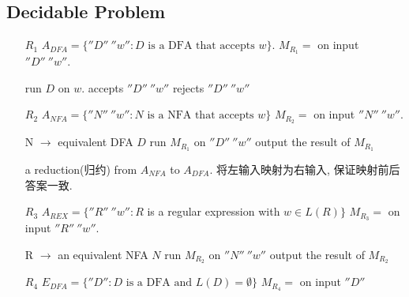 \subsection{Decidable Problem}
\begin{enumerate}
    \item [$R_1$] $A_{DFA}=\{ ''D''\ ''w'': D \text{ is a DFA that accepts }w \}$. 
    \subitem $M_{R_1}=$ on input $''D''\ ''w''$.

    \begin{algorithm}[!htb]
        \caption{$R_1$}
        \begin{algorithmic}
            \State run $D$ on $w$.
                \State accepts $''D''\ ''w''$
            \Else
                \State rejects $''D''\ ''w''$
            \EndIf
        \end{algorithmic}
    \end{algorithm}
    \item [$R_2$] $A_{NFA}=\{ ''N''\ ''w'': N \text{ is a NFA that accepts }w \}$
    \subitem $M_{R_2}=$ on input $''N''\ ''w''$.
    \begin{algorithm}[H]
        \caption{$R_2$}
        \begin{algorithmic}
            \State N $\to$ equivalent DFA $D$
            \State run $M_{R_1}$ on $''D''\ ''w''$
            \State output the result of $M_{R_1}$
        \end{algorithmic}
    \end{algorithm}
    a reduction(归约) from $A_{NFA}$ to $A_{DFA}$. 将左输入映射为右输入, 保证映射前后答案一致. 
    \item [$R_3$] $A_{REX}=\{ ''R''\ ''w'': R $ is a regular expression with $w\in L(R)  \}$
    \subitem $M_{R_3}=$ on input $''R''\ ''w''$.
    \begin{algorithm}[H]
        \caption{$R_3$}
        \begin{algorithmic}
            \State R $\to$ an equivalent NFA $N$
            \State run $M_{R_2}$ on $''N''\ ''w''$
            \State output the result of $M_{R_2}$
        \end{algorithmic}
    \end{algorithm}
    \item [$R_4$] $E_{DFA}=\{ ''D'': D \text{ is a DFA and }L(D)=\emptyset \}$
    \subitem $M_{R_4}=$ on input $''D''$
    \begin{algorithm}[H]
        \caption{$R_4$}
        \begin{algorithmic}

\end{algorithmic}
\end{algorithm}
\end{enumerate}
